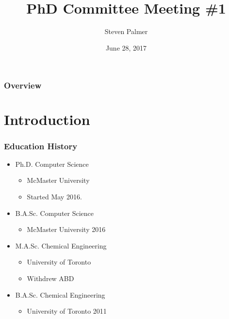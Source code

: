 \documentclass{beamer}
\title[\pgfuseimage{logo}]  %
{PhD Committee Meeting \#1}
\author[Slide \thepage~of \pageref{TotPages}] %
{Steven Palmer}
\institute[McMaster University] %
{
  Computing and Software Department\\
  Faculty of Engineering\\
  McMaster University
}
\date[June 28, 2017] %
{June 28, 2017}
\begin{document}
\begin{frame}

\titlepage

\end{frame}


\begin{frame}

\frametitle{Overview}
\tableofcontents


\end{frame}


\section[Introduction]{Introduction}



\begin{frame}

\frametitle{Education History}

\begin{itemize}
\item Ph.D. Computer Science
	\begin{itemize}
	\item McMaster University
    \item Started May 2016.
	\end{itemize}
\item B.A.Sc. Computer Science
	\begin{itemize}
	\item McMaster University 2016
	\end{itemize}
\item M.A.Sc. Chemical Engineering
    \begin{itemize}
    \item University of Toronto
    \item Withdrew ABD
    \end{itemize}
\item B.A.Sc. Chemical Engineering 
    \begin{itemize}
	\item University of Toronto 2011
	\end{itemize}

\end{itemize}
\end{frame}
\end{document}
